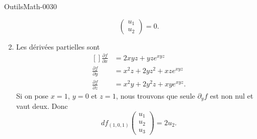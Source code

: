 \begin{corrige}{OutilsMath-0030}
\begin{enumerate}
\begin{equation}
\begin{pmatrix}
                    u_1    \\ 
                    u_2    
                \end{pmatrix}=0.
            \end{equation}
        \item
            Les dérivées partielles sont
            \begin{equation}
                \begin{aligned}[]
                    \frac{ \partial f }{ \partial x }&=2xyz+yz e^{xyz}\\
                    \frac{ \partial f }{ \partial y }&=x^2z+2yz^2+xz e^{xyz}\\
                    \frac{ \partial f }{ \partial z }&=x^2y+2y^2z+xy e^{xyz}.
                \end{aligned}
            \end{equation}
            Si on pose $x=1$, $y=0$ et $z=1$, nous trouvons que seule $\partial_yf$ est non nul et vaut deux. Donc
            \begin{equation}
                df_{(1,0,1)}\begin{pmatrix}
                    u_1    \\ 
                    u_2    \\ 
                    u_3    
                \end{pmatrix}=2u_2.
            \end{equation}
    \end{enumerate}

\end{corrige}
